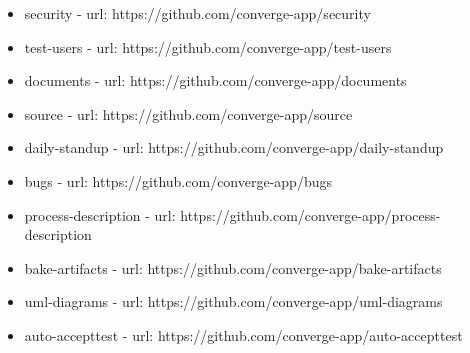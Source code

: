 \begin{itemize}
  \item security - url: https://github.com/converge-app/security
  \item test-users - url: https://github.com/converge-app/test-users
  \item documents - url: https://github.com/converge-app/documents
  \item source - url: https://github.com/converge-app/source
  \item daily-standup - url: https://github.com/converge-app/daily-standup
  \item bugs - url: https://github.com/converge-app/bugs
  \item process-description - url: https://github.com/converge-app/process-description
  \item bake-artifacts - url: https://github.com/converge-app/bake-artifacts
  \item uml-diagrams - url: https://github.com/converge-app/uml-diagrams
  \item auto-accepttest - url: https://github.com/converge-app/auto-accepttest
\end{itemize}
